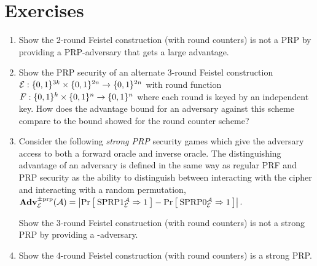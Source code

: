 
\section*{Exercises}

\begin{enumerate}[label=\textbf{Exercise \thesection.\arabic*}, wide=0pt]
  \item Show the 2-round Feistel construction (with round counters) is not a PRP by providing a PRP-adversary that gets a large advantage.
  \item Show the PRP security of an alternate 3-round Feistel construction ${\cal E}:\{0,1\}^{3k}\times\{0,1\}^{2n}\rightarrow\{0,1\}^{2n}$ with round function $F:\{0,1\}^k \times\{0,1\}^n\rightarrow\{0,1\}^n$ where each round is keyed by an independent key.
  How does the advantage bound for an adversary against this scheme compare to the bound showed for the round counter scheme?
  \item Consider the following \emph{strong PRP} security games which give the adversary access to both a forward oracle and inverse oracle.
  The distinguishing advantage of an adversary is defined in the same way as regular PRF and PRP security as the ability to distinguish between interacting with the cipher and interacting with a random permutation,
  $\mathbf{Adv}^{\mathrm{\pm prp}}_{{\cal E}}({\mathcal A}) = \left| \Pr\left[\: \textnormal{SPRP}1_{\cal E}^{\mathcal A}\Rightarrow 1 \:\right] - \Pr\left[\: \textnormal{SPRP}0_{\cal E}^{\mathcal A}\Rightarrow1 \:\right] \right|$.


	\begin{center}
\end{center}

  Show the 3-round Feistel construction (with round counters) is not a strong PRP by providing a \SPRP-adversary.
  \item Show the 4-round Feistel construction (with round counters) is a strong PRP.
\end{enumerate}
